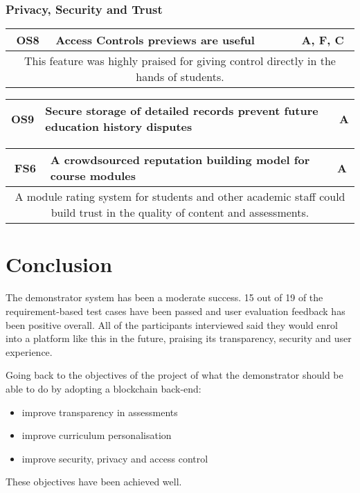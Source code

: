 \subsubsection{Privacy, Security and Trust}

\begin{table}[!ht]
	\begin{tabularx}{\textwidth}{|c|X|c|}
		\hline
		OS8 & \textbf{Access Controls previews are useful} & A, F, C                 \\
		\hline
		\multicolumn{3}{|X|}{
			This feature was highly praised for giving control directly in the hands of students.
		} \\
		\hline
	\end{tabularx}
\end{table}

\begin{table}[!ht]
	\begin{tabularx}{\textwidth}{|c|X|c|}
		\hline
		OS9 & \textbf{Secure storage of detailed records prevent future education history disputes} & A                 \\
		\hline
	\end{tabularx}
\end{table}

\begin{table}[!ht]
	\begin{tabularx}{\textwidth}{|c|X|c|}
		\hline
		FS6 & \textbf{A crowdsourced reputation building model for course modules} & A  \\
		\hline
		\multicolumn{3}{|X|}{
			A module rating system for students and other academic staff could build trust
			in the quality of content and assessments.
		} \\
		\hline
	\end{tabularx}
\end{table}

\section{Conclusion}

The demonstrator system has been a moderate success. 15 out of 19 of the requirement-based test cases have been passed and 
user evaluation feedback has been positive overall.
All of the participants interviewed said they would enrol into a platform like this in the future, 
praising its transparency, security and user experience.

Going back to the objectives of the project of what the demonstrator should be able to do by adopting a blockchain back-end:

\begin{itemize}
	\item improve transparency in assessments 
	\item improve curriculum personalisation
	\item improve security, privacy and access control
\end{itemize}

These objectives have been achieved well.

